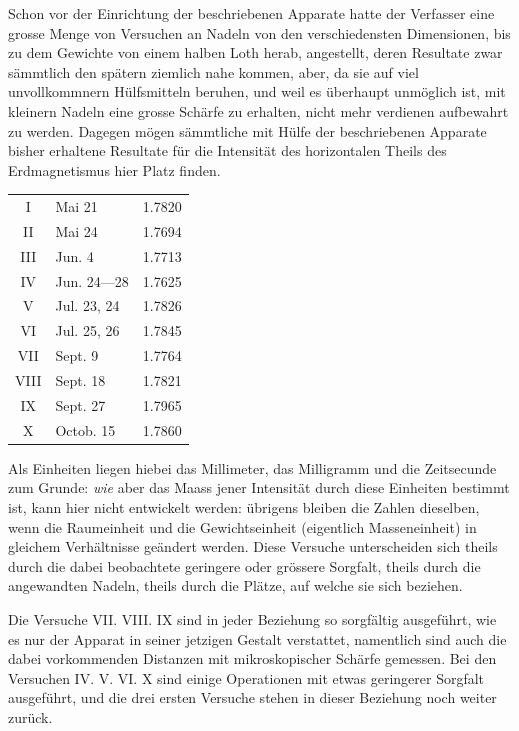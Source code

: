 Schon vor der Einrichtung der beschriebenen Apparate hatte der
Verfasser eine grosse Menge von Versuchen an Nadeln von den
verschiedensten Dimensionen, bis zu dem Gewichte von einem
halben Loth herab, angestellt, deren Resultate zwar sämmtlich
den spätern ziemlich nahe kommen, aber, da sie auf viel
unvollkommnern Hülfsmitteln beruhen, und weil es überhaupt
unmöglich ist,
\clearpage
{}
\noindent
mit kleinern Nadeln eine grosse Schärfe zu erhalten, nicht mehr
verdienen aufbewahrt zu werden. Dagegen mögen sämmtliche mit
Hülfe der beschriebenen Apparate bisher erhaltene Resultate
für die Intensität des horizontalen Theils des Erdmagnetismus
hier Platz finden.
\begin{center}
\begin{tabular}{c|l|l}
I    & Mai 21       & 1.7820\\
II   & Mai 24       & 1.7694\\
III  & Jun. 4       & 1.7713\\
IV   & Jun. 24---28 & 1.7625\\
V    & Jul. 23, 24  & 1.7826\\
VI   & Jul. 25, 26  & 1.7845\\
VII  & Sept. 9      & 1.7764\\
VIII & Sept. 18     & 1.7821\\
IX   & Sept. 27     & 1.7965\\
X    & Octob. 15    & 1.7860
\end{tabular}
\end{center}

Als Einheiten liegen hiebei das Millimeter, das Milligramm und die
Zeitsecunde zum Grunde: \textit{wie} aber das Maass jener Intensität
durch diese Einheiten bestimmt ist, kann hier nicht entwickelt
werden: übrigens bleiben die Zahlen dieselben, wenn die Raumeinheit
und die Gewichtseinheit (eigentlich Masseneinheit) in gleichem
Verhältnisse geändert werden. Diese Versuche unterscheiden sich
theils durch die dabei beobachtete geringere oder grössere Sorgfalt,
theils durch die angewandten Nadeln, theils durch die Plätze,
auf welche sie sich beziehen.

Die Versuche VII. VIII. IX sind in jeder Beziehung so sorgfältig
ausgeführt, wie es nur der Apparat in seiner jetzigen Gestalt
verstattet, namentlich sind auch die dabei vorkommenden Distanzen
mit mikroskopischer Schärfe gemessen. Bei den Versuchen IV. V. VI. X
sind einige Operationen mit etwas geringerer Sorgfalt ausgeführt,
und die drei ersten Versuche stehen in dieser Beziehung noch
weiter zurück.

